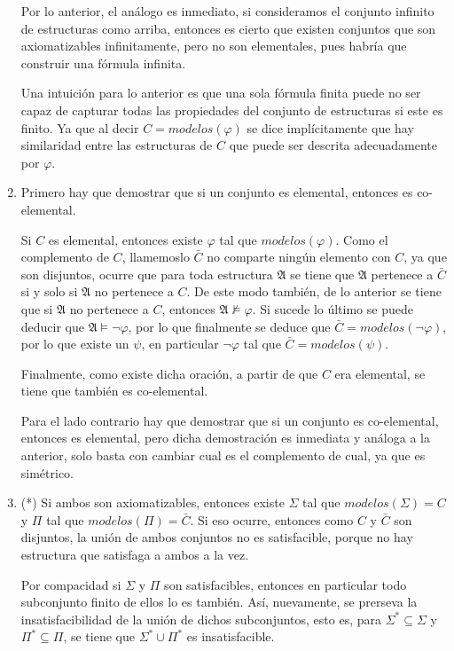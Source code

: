 \documentclass[letterpaper,10pt]{article}
\begin{document}
\begin{enumerate}
    Por lo anterior, el análogo es inmediato, si consideramos el conjunto infinito de estructuras como arriba, entonces es cierto que existen conjuntos que son axiomatizables infinitamente, pero no son elementales, pues habría que construir una fórmula infinita.

    Una intuición para lo anterior es que una sola fórmula finita puede no ser capaz de capturar todas las propiedades del conjunto de estructuras si este es finito. Ya que al decir $C=modelos(\varphi)$ se dice implícitamente que hay similaridad entre las estructuras de $C$ que puede ser descrita adecuadamente por $\varphi$.

    \item Primero hay que demostrar que si un conjunto es elemental, entonces es co-elemental.

    Si $C$ es elemental, entonces existe $\varphi$ tal que $modelos(\varphi)$. Como el complemento de $C$, llamemoslo $\bar{C}$ no comparte ningún elemento con $C$, ya que son disjuntos, ocurre que para toda estructura $\mathfrak{A}$ se tiene que $\mathfrak{A}$ pertenece a $\bar{C}$ si y solo si $\mathfrak{A}$ no pertenece a $C$. De este modo también, de lo anterior se tiene que si $\mathfrak{A}$ no pertenece a $C$, entonces $\mathfrak{A} \not\models \varphi$. Si sucede lo último se puede deducir que $\mathfrak{A} \models \neg\varphi$, por lo que finalmente se deduce que $\bar{C} = modelos(\neg\varphi)$, por lo que existe un $\psi$, en particular $\neg\varphi$ tal que $\bar{C} = modelos(\psi)$.

    Finalmente, como existe dicha oración, a partir de que $C$ era elemental, se tiene que también es co-elemental.

    Para el lado contrario hay que demostrar que si un conjunto es co-elemental, entonces es elemental, pero dicha demostración es inmediata y análoga a la anterior, solo basta con cambiar cual es el complemento de cual, ya que es simétrico.

    \item (*) Si ambos son axiomatizables, entonces existe $\Sigma$ tal que $modelos(\Sigma) = C$ y $\Pi$ tal que $modelos(\Pi) = \bar{C}$. Si eso ocurre, entonces como $C$ y $\bar{C}$ son disjuntos, la unión de ambos conjuntos no es satisfacible, porque no hay estructura que satisfaga a ambos a la vez.

    Por compacidad si $\Sigma$ y $\Pi$ son satisfacibles, entonces en particular todo subconjunto finito de ellos lo es también. Así, nuevamente, se prerseva la insatisfacibilidad de la unión de dichos subconjuntos, esto es, para $\Sigma^* \subseteq \Sigma$ y $\Pi^* \subseteq \Pi$, se tiene que $\Sigma^* \cup \Pi^*$ es insatisfacible.


\end{enumerate}
\end{document}
